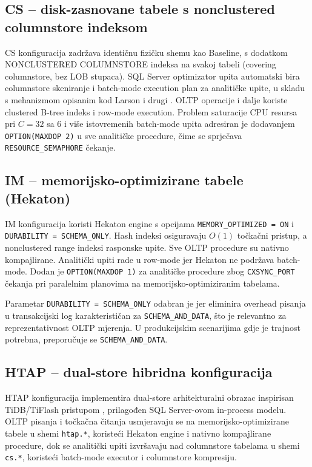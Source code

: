 \subsection{CS -- disk-zasnovane tabele s nonclustered columnstore indeksom}

CS konfiguracija zadržava identičnu fizičku shemu kao Baseline, s dodatkom NONCLUSTERED COLUMNSTORE indeksa na svakoj tabeli (covering columnstore, bez LOB stupaca). SQL Server optimizator upita automatski bira columnstore skeniranje i batch-mode execution plan za analitičke upite, u skladu s mehanizmom opisanim kod Larson i drugi \cite{larson2013columnstore}. OLTP operacije i dalje koriste clustered B-tree indeks i row-mode execution. Problem saturacije CPU resursa pri $C=32$ sa 6 i više istovremenih batch-mode upita adresiran je dodavanjem \texttt{OPTION(MAXDOP 2)} u sve analitičke procedure, čime se sprječava \texttt{RESOURCE\_SEMAPHORE} čekanje.

\subsection{IM -- memorijsko-optimizirane tabele (Hekaton)}

IM konfiguracija koristi Hekaton engine s opcijama \texttt{MEMORY\_OPTIMIZED = ON} i \texttt{DURABILITY = SCHEMA\_ONLY}. Hash indeksi osiguravaju $O(1)$ točkačni pristup, a nonclustered range indeksi rasponske upite. Sve OLTP procedure su nativno kompajlirane. Analitički upiti rade u row-mode jer Hekaton ne podržava batch-mode. Dodan je \texttt{OPTION(MAXDOP 1)} za analitičke procedure zbog \texttt{CXSYNC\_PORT} čekanja pri paralelnim planovima na memorijsko-optimiziranim tabelama.

Parametar \texttt{DURABILITY = SCHEMA\_ONLY} odabran je jer eliminira overhead pisanja u transakcijski log karakterističan za \mbox{\texttt{SCHEMA\_AND\_DATA}}, što je relevantno za reprezentativnost OLTP mjerenja. U produkcijskim scenarijima gdje je trajnost potrebna, preporučuje se \texttt{SCHEMA\_AND\_DATA}.

\subsection{HTAP -- dual-store hibridna konfiguracija}

HTAP konfiguracija implementira dual-store arhitekturalni obrazac inspirisan TiDB/TiFlash pristupom \cite{huang2020tidb}, prilagođen SQL Server-ovom in-process modelu. OLTP pisanja i točkačna čitanja usmjeravaju se na memorijsko-optimizirane tabele u shemi \texttt{htap.*}, koristeći Hekaton engine i nativno kompajlirane procedure, dok se analitički upiti izvršavaju nad columnstore tabelama u shemi \texttt{cs.*}, koristeći batch-mode executor i columnstore kompresiju.

